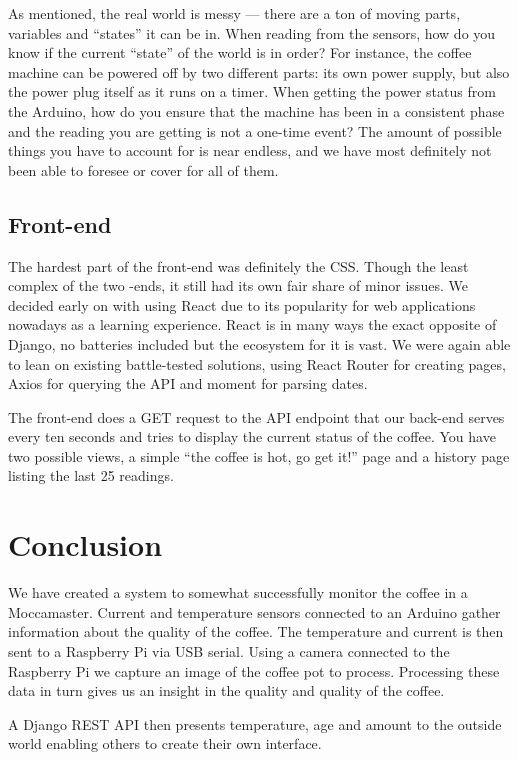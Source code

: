 \documentclass[12pt,a4paper,oneside,article]{memoir}
\numberwithin{equation}{chapter}
\begin{document}
As mentioned, the real world is messy --- there are a ton of moving parts,
variables and ``states'' it can be in. When reading from the sensors, how do you
know if the current ``state'' of the world is in order? For instance, the coffee
machine can be powered off by two different parts: its own power supply, but
also the power plug itself as it runs on a timer. When getting the power status
from the Arduino, how do you ensure that the machine has been in a consistent
phase and the reading you are getting is not a one-time event? The amount of
possible things you have to account for is near endless, and we have most
definitely not been able to foresee or cover for all of them.

\subsection{Front-end}\label{sec:front-end}
The hardest part of the front-end was definitely the CSS. Though the least
complex of the two -ends, it still had its own fair share of minor issues. We
decided early on with using React due to its popularity for web applications
nowadays as a learning experience. React is in many ways the exact opposite of
Django, no batteries included but the ecosystem for it is vast. We were again
able to lean on existing battle-tested solutions, using React Router for
creating pages, Axios for querying the API and moment for parsing dates.

The front-end does a GET request to the API endpoint that our back-end serves
every ten seconds and tries to display the current status of the coffee. You
have two possible views, a simple ``the coffee is hot, go get it!'' page and a
history page listing the last 25 readings.

\section{Conclusion}\label{sec:conclusion}
We have created a system to somewhat successfully monitor the coffee in a
Moccamaster. %
Current and temperature sensors connected to an Arduino gather information about
the quality of the coffee. The temperature and current is then sent to a 
Raspberry Pi via USB serial. Using a camera connected to the Raspberry Pi we 
capture an image of the coffee pot to process. Processing these data in 
turn gives us an insight in the quality and quality of the coffee.

A Django REST API then presents temperature, age and amount to the outside 
world enabling others to create their own interface. 
\end{document}
